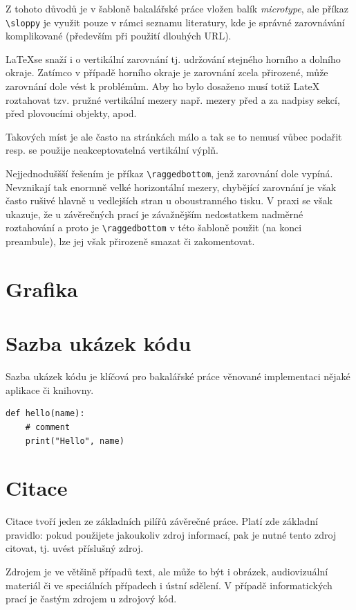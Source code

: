 \documentclass[male,czech,api_bc]{kitheses}
\begin{document}
Z tohoto důvodů je v šabloně bakalářské práce vložen balík  \textit{microtype}, ale příkaz \verb!\sloppy! je využit pouze v rámci seznamu literatury, kde je správné zarovnávání komplikované (především při použití dlouhých URL).

\LaTeX se snaží i o vertikální zarovnání tj. udržování stejného horního a dolního okraje. Zatímco v případě horního okraje je zarovnání zcela přirozené, může zarovnání dole vést k problémům. Aby ho bylo dosaženo musí totiž LateX roztahovat tzv. pružné vertikální mezery např. mezery před a za nadpisy sekcí, před plovoucími objekty, apod.

Takových míst je ale často na stránkách málo a tak se to nemusí vůbec podařit resp. se použije neakceptovatelná vertikální výplň. 

Nejjednoduššší řešením je příkaz \verb!\raggedbottom!, jenž zarovnání dole vypíná. Nevznikají tak enormně velké horizontální mezery, chybějící zarovnání je však často rušivé hlavně u vedlejších
stran u oboustranného tisku. V praxi se však ukazuje, že u závěrečných prací  je závažnějším nedostatkem nadměrné roztahování a proto je \verb!\raggedbottom! v této šabloně použit (na konci preambule), lze jej však přirozeně smazat či zakomentovat.


\chapter{Grafika}

\chapter{Sazba ukázek kódu}

Sazba ukázek kódu je klíčová pro bakalářské práce věnované implementaci nějaké aplikace či knihovny.

\begin{verbatim}
def hello(name):
    # comment
    print("Hello", name)
\end{verbatim}

\chapter{Citace}

Citace tvoří jeden ze základních pilířů závěrečné práce. Platí zde základní pravidlo: pokud použijete 
jakoukoliv zdroj informací, pak je nutné tento zdroj citovat, tj. uvést příslušný zdroj.

Zdrojem je ve většině případů text, ale může to být i obrázek, audiovizuální materiál či ve speciálních případech i ústní sdělení. V případě informatických prací je častým zdrojem u zdrojový kód.
\end{document}
